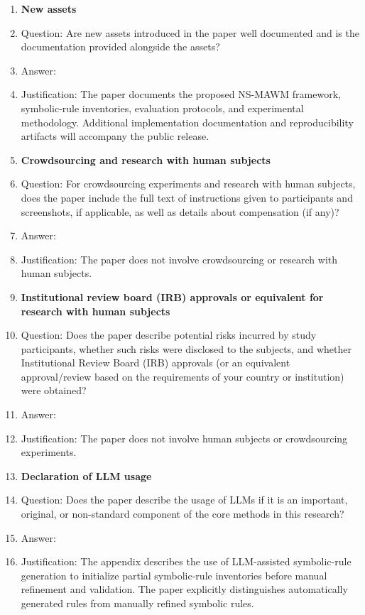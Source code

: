 \begin{enumerate}
      \item {\bf New assets}
      \item[] Question: Are new assets introduced in the paper well documented and is the documentation provided alongside the assets?
      \item[] Answer: \answerYes{}
      \item[] Justification: The paper documents the proposed NS-MAWM framework, symbolic-rule inventories, evaluation protocols, and experimental methodology. Additional implementation documentation and reproducibility artifacts will accompany the public release.

      \item {\bf Crowdsourcing and research with human subjects}
      \item[] Question: For crowdsourcing experiments and research with human subjects, does the paper include the full text of instructions given to participants and screenshots, if applicable, as well as details about compensation (if any)?
      \item[] Answer: \answerNA{}
      \item[] Justification: The paper does not involve crowdsourcing or research with human subjects.

      \item {\bf Institutional review board (IRB) approvals or equivalent for research with human subjects}
      \item[] Question: Does the paper describe potential risks incurred by study participants, whether such risks were disclosed to the subjects, and whether Institutional Review Board (IRB) approvals (or an equivalent approval/review based on the requirements of your country or institution) were obtained?
      \item[] Answer: \answerNA{}
      \item[] Justification: The paper does not involve human subjects or crowdsourcing experiments.

      \item {\bf Declaration of LLM usage}
      \item[] Question: Does the paper describe the usage of LLMs if it is an important, original, or non-standard component of the core methods in this research?
      \item[] Answer: \answerYes{}
      \item[] Justification: The appendix describes the use of LLM-assisted symbolic-rule generation to initialize partial symbolic-rule inventories before manual refinement and validation. The paper explicitly distinguishes automatically generated rules from manually refined symbolic rules.

\end{enumerate}